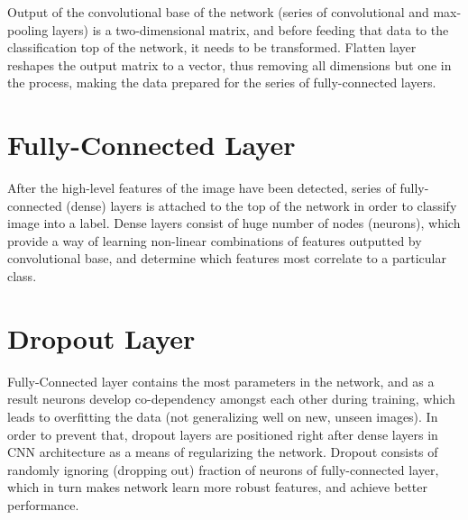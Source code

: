 Output of the convolutional base of the network (series of convolutional and max-pooling layers) is a two-dimensional matrix, and before feeding that data to the classification top of the network, it needs to be transformed. Flatten layer reshapes the output matrix to a vector, thus removing all dimensions but one in the process, making the data prepared for the series of fully-connected layers.

\section{Fully-Connected Layer}

After the high-level features of the image have been detected, series of fully-connected (dense) layers is attached to the top of the network in order to classify image into a label. Dense layers consist of huge number of nodes (neurons), which provide a way of learning non-linear combinations of features outputted by convolutional base, and determine which features most correlate to a particular class.

\section{Dropout Layer}

Fully-Connected layer contains the most parameters in the network, and as a result neurons develop co-dependency amongst each other during training, which leads to overfitting the data (not generalizing well on new, unseen images). In order to prevent that, dropout layers are positioned right after dense layers in CNN architecture as a means of regularizing the network. Dropout consists of randomly ignoring (dropping out) fraction of neurons of fully-connected layer, which in turn makes network learn more robust features, and achieve better performance.
\clearpage
